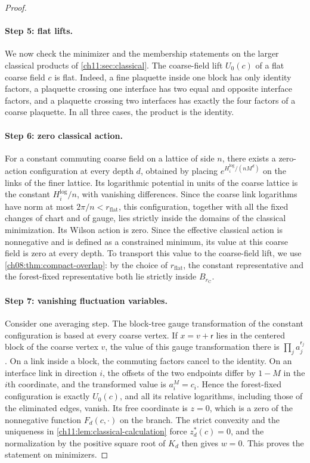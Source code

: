 \begin{proof}
\paragraph{Step 5: flat lifts.}
We now check the minimizer and the membership statements on the larger classical products of \cref{ch11:sec:classical}. The coarse-field lift $U_0(c)$ of a flat coarse field $c$ is flat. Indeed, a fine plaquette inside one block has only identity factors, a plaquette crossing one interface has two equal and opposite interface factors, and a plaquette crossing two interfaces has exactly the four factors of a coarse plaquette. In all three cases, the product is the identity.

\paragraph{Step 6: zero classical action.}
For a constant commuting coarse field on a lattice of side $n$, there exists a zero-action configuration at every depth $d$, obtained by placing $e^{H^{\log}_i/(nM^d)}$ on the links of the finer lattice. Its logarithmic potential in units of the coarse lattice is the constant $H^{\log}_i/n$, with vanishing differences. Since the coarse link logarithms have norm at most $2\pi/n<r_{\mathrm{flat}}$, this configuration, together with all the fixed changes of chart and of gauge, lies strictly inside the domains of the classical minimization. Its Wilson action is zero. Since the effective classical action is nonnegative and is defined as a constrained minimum, its value at this coarse field is zero at every depth. To transport this value to the coarse-field lift, we use \cref{ch08:thm:compact-overlap}: by the choice of $r_{\mathrm{flat}}$, the constant representative and the forest-fixed representative both lie strictly inside $B_{r_{\mathrm C}}$.

\paragraph{Step 7: vanishing fluctuation variables.}
Consider one averaging step. The block-tree gauge transformation of the constant configuration is based at every coarse vertex. If $x=v+\mathsf r$ lies in the centered block of the coarse vertex $v$, the value of this gauge transformation there is $\prod_ja_j^{\mathsf r_j}$. On a link inside a block, the commuting factors cancel to the identity. On an interface link in direction $i$, the offsets of the two endpoints differ by $1-M$ in the $i$th coordinate, and the transformed value is $a_i^M=c_i$. Hence the forest-fixed configuration is exactly $U_0(c)$, and all its relative logarithms, including those of the eliminated edges, vanish. Its free coordinate is $z=0$, which is a zero of the nonnegative function $F_d(c,\cdot)$ on the branch. The strict convexity and the uniqueness in \cref{ch11:lem:classical-calculation} force $z_d^*(c)=0$, and the normalization by the positive square root of $K_d$ then gives $w=0$. This proves the statement on minimizers.


\end{proof}
